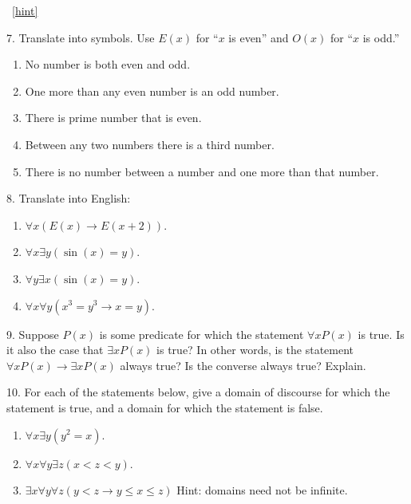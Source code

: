 \documentclass[10pt,]{book}
\theoremstyle{plain}
\theoremstyle{definition}
\theoremstyle{definition}
\theoremstyle{definition}
\numberwithin{equation}{chapter}
\def\imp{\rightarrow}
\newcommand{\lt}{<}
\begin{document}
\begin{exerciselist}
\par\smallskip
~\hfill{\tiny\hyperlink{a-B.1.6}{[hint]}\hypertarget{q-B.1.6}{}}\item[7.]\hypertarget{exercise-62}{}\hypertarget{p-1986}{}%
Translate into symbols. Use \(E(x)\) for ``\(x\) is even'' and \(O(x)\) for ``\(x\) is odd.''%
\leavevmode%
\begin{enumerate}[label=(\alph*)]
\item\hypertarget{li-214}{}\hypertarget{p-1987}{}%
No number is both even and odd.%
\item\hypertarget{li-215}{}\hypertarget{p-1988}{}%
One more than any even number is an odd number.%
\item\hypertarget{li-216}{}\hypertarget{p-1989}{}%
There is prime number that is even.%
\item\hypertarget{li-217}{}\hypertarget{p-1990}{}%
Between any two numbers there is a third number.%
\item\hypertarget{li-218}{}\hypertarget{p-1991}{}%
There is no number between a number and one more than that number.%
\end{enumerate}
\par\smallskip
\item[8.]\hypertarget{exercise-63}{}\hypertarget{p-1993}{}%
Translate into English: \leavevmode%
\begin{enumerate}[label=(\alph*)]
\item\hypertarget{li-224}{}\(\forall x (E(x) \imp E(x +2))\).%
\item\hypertarget{li-225}{}\(\forall x \exists y (\sin(x) = y)\).%
\item\hypertarget{li-226}{}\(\forall y \exists x (\sin(x) = y)\).%
\item\hypertarget{li-227}{}\(\forall x \forall y (x^3 = y^3 \imp x = y)\).%
\end{enumerate}
%
\par\smallskip
\item[9.]\hypertarget{exercise-64}{}\hypertarget{p-1999}{}%
Suppose \(P(x)\) is some predicate for which the statement \(\forall x P(x)\) is true. Is it also the case that \(\exists x P(x)\) is true? In other words, is the statement \(\forall x P(x) \imp \exists x P(x)\) always true? Is the converse always true? Explain.%
\par\smallskip
\item[10.]\hypertarget{exercise-65}{}\hypertarget{p-2000}{}%
For each of the statements below, give a domain of discourse for which the statement is true, and a domain for which the statement is false.%
\par
\hypertarget{p-2001}{}%
\leavevmode%
\begin{enumerate}[label=(\alph*)]
\item\hypertarget{li-232}{}\(\forall x \exists y (y^2 = x)\).%
\item\hypertarget{li-233}{}\(\forall x \forall y \exists z (x \lt  z \lt  y)\).%
\item\hypertarget{li-234}{}\(\exists x \forall y \forall z (y \lt  z \imp y \le x \le z)\) Hint: domains need not be infinite.%
\end{enumerate}
%
\par\smallskip
\end{exerciselist}
\end{document}
